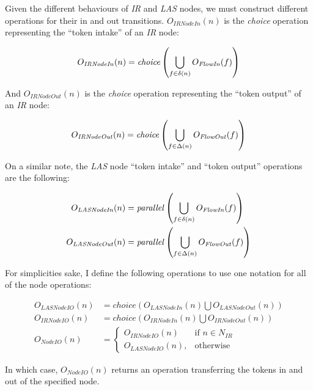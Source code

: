 \begin{definition}
	Given the different behaviours of \emph{IR} and \emph{LAS} nodes, we must construct different operations for their in and out transitions. \(O_\mathit{IRNodeIn}(n)\) is the \emph{choice} operation representing the \enquote{token intake} of an \emph{IR} node:
	
	\begin{equation*}
		O_\mathit{IRNodeIn}(n) = \mathit{choice}\left(\bigcup_{f \in \delta(n)} O_\mathit{FlowIn}(f)\right)
	\end{equation*}
	
	And \(O_\mathit{IRNodeOut}(n)\) is the \emph{choice} operation representing the \enquote{token output} of an \emph{IR} node:

	\begin{equation*}
		O_\mathit{IRNodeOut}(n) = \mathit{choice}\left(\bigcup_{f \in \Delta(n)} O_\mathit{FlowOut}(f)\right)
	\end{equation*}

	On a similar note, the \emph{LAS} node \enquote{token intake} and \enquote{token output} operations are the following:
	
	\begin{align*}
		O_\mathit{LASNodeIn}(n) &= \mathit{parallel}\left(\bigcup_{f \in \delta(n)} O_\mathit{FlowIn}(f)\right)\\
		O_\mathit{LASNodeOut}(n) &= \mathit{parallel}\left(\bigcup_{f \in \Delta(n)} O_\mathit{FlowOut}(f)\right)
	\end{align*}

	For simplicities sake, I define the following operations to use one notation for all of the node operations:

	\begin{align*}
		O_\mathit{LASNodeIO}(n) &= \mathit{choice}(O_\mathit{LASNodeIn}(n) \bigcup O_\mathit{LASNodeOut}(n))\\
		O_\mathit{IRNodeIO}(n) &= \mathit{choice}(O_\mathit{IRNodeIn}(n) \bigcup O_\mathit{IRNodeOut}(n))\\
		O_\mathit{NodeIO}(n) &= 
		\begin{cases}
			O_\mathit{IRNodeIO}(n) & \text{if } n \in N_{IR} \\
			O_\mathit{LASNodeIO}(n), & \text{otherwise}
		\end{cases}
	\end{align*}

	In which case, \(O_\mathit{NodeIO}(n)\) returns an operation transferring the tokens in and out of the specified node.

\end{definition}

